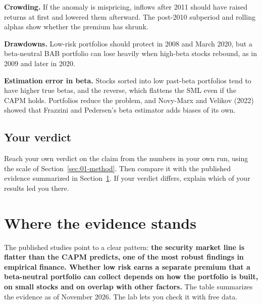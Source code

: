 \textbf{Crowding.} If the anomaly is mispricing, inflows after 2011 should have raised returns at first and lowered them afterward. The post-2010 subperiod and rolling alphas show whether the premium has shrunk.

\textbf{Drawdowns.} Low-risk portfolios should protect in 2008 and March 2020, but a beta-neutral BAB portfolio can lose heavily when high-beta stocks rebound, as in 2009 and later in 2020.

\textbf{Estimation error in beta.} Stocks sorted into low past-beta portfolios tend to have higher true betas, and the reverse, which flattens the SML even if the CAPM holds. Portfolios reduce the problem, and Novy-Marx and Velikov (2022) showed that Frazzini and Pedersen's beta estimator adds biases of its own.

\subsection*{Your verdict}

Reach your own verdict on the claim from the numbers in your own run, using the scale of Section~\ref{sec:01-method}. Then compare it with the published evidence summarized in Section~\ref{sec:18-verdict}. If your verdict differs, explain which of your results led you there.

\section{Where the evidence stands}
\label{sec:18-verdict}

The published studies point to a clear pattern: \textbf{the security market line is flatter than the CAPM predicts, one of the most robust findings in empirical finance. Whether low risk earns a separate premium that a beta-neutral portfolio can collect depends on how the portfolio is built, on small stocks and on overlap with other factors.} The table summarizes the evidence as of November 2026. The lab lets you check it with free data.

